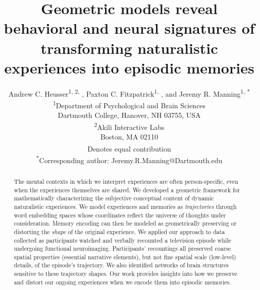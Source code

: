 \documentclass[10pt]{article}
\title{Geometric models reveal behavioral and neural signatures of transforming naturalistic experiences into episodic memories}
\author{Andrew C. Heusser\textsuperscript{1, 2, \textdagger}, Paxton C. Fitzpatrick\textsuperscript{1, \textdagger}, and Jeremy R. Manning\textsuperscript{1, *}\\\textsuperscript{1}Department of Psychological and Brain Sciences\\Dartmouth College, Hanover, NH 03755, USA\\\textsuperscript{2}Akili Interactive Labs\\Boston, MA 02110\\\textsuperscript{\textdagger}Denotes equal contribution\\\textsuperscript{*}Corresponding author: Jeremy.R.Manning@Dartmouth.edu}
\begin{document}
\begin{titlepage}
  \maketitle
  \thispagestyle{empty}
  \end{titlepage}

\begin{abstract}
The mental contexts in which we interpret experiences are often person-specific, even when the experiences themselves are shared. We developed a geometric framework for mathematically characterizing the subjective conceptual content of dynamic naturalistic experiences. We model experiences and memories as \textit{trajectories} through word embedding spaces whose coordinates reflect the universe of thoughts under consideration. Memory encoding can then be modeled as geometrically preserving or distorting the \textit{shape} of the original experience. We applied our approach to data collected as participants watched and verbally recounted a television episode while undergoing functional neuroimaging. Participants’ recountings all preserved coarse spatial properties (essential narrative elements), but not fine spatial scale (low-level) details, of the episode’s trajectory. We also identified networks of brain structures sensitive to these trajectory shapes. Our work provides insights into how we preserve and distort our ongoing experiences when we encode them into episodic memories.
\end{abstract}
\end{document}
